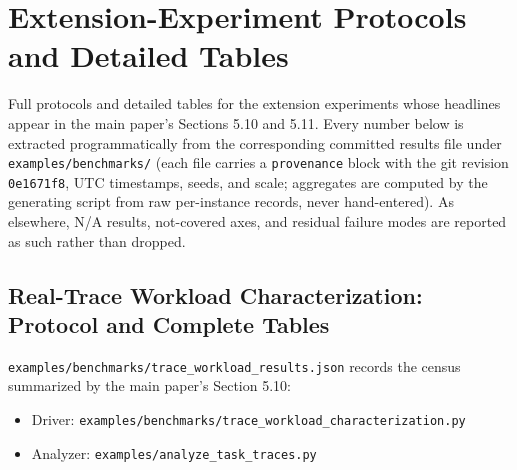 \documentclass[
  11pt,
]{article}
\providecommand{\tightlist}{%
  \setlength{\itemsep}{0pt}\setlength{\parskip}{0pt}}
\begin{document}
\section{Extension-Experiment Protocols and Detailed
Tables}\label{extension-experiment-protocols-and-detailed-tables}

Full protocols and detailed tables for the extension experiments whose
headlines appear in the main paper's Sections 5.10 and 5.11. Every
number below is extracted programmatically from the corresponding
committed results file under \texttt{examples/benchmarks/} (each file
carries a \texttt{provenance} block with the git revision
\texttt{0e1671f8}, UTC timestamps, seeds, and scale; aggregates are
computed by the generating script from raw per-instance records, never
hand-entered). As elsewhere, N/A results, not-covered axes, and residual
failure modes are reported as such rather than dropped.

\subsection{Real-Trace Workload Characterization: Protocol and Complete
Tables}\label{real-trace-workload-characterization-protocol-and-complete-tables}

\texttt{examples/benchmarks/trace\_workload\_results.json} records the
census summarized by the main paper's Section 5.10:

\begin{itemize}
\tightlist
\item
  Driver:
  \texttt{examples/benchmarks/trace\_workload\_characterization.py}
\item
  Analyzer: \texttt{examples/analyze\_task\_traces.py}
\end{itemize}
\end{document}
